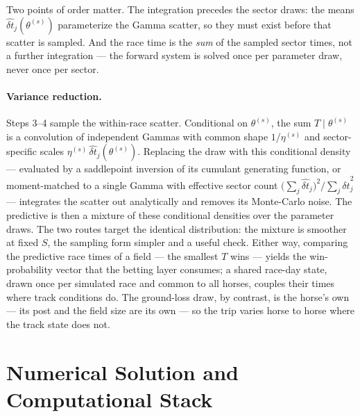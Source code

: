 \documentclass[11pt]{article}
\begin{document}
Two points of order matter. The integration precedes the sector draws: the means $\hat{\delta t}_j(\theta^{(s)})$ parameterize the Gamma scatter, so they must exist before that scatter is sampled. And the race time is the \emph{sum} of the sampled sector times, not a further integration --- the forward system is solved once per parameter draw, never once per sector.

\paragraph{Variance reduction.} Steps 3--4 sample the within-race scatter. Conditional on $\theta^{(s)}$, the sum $T \mid \theta^{(s)}$ is a convolution of independent Gammas with common shape $1/\eta^{(s)}$ and sector-specific scales $\eta^{(s)}\, \hat{\delta t}_j(\theta^{(s)})$. Replacing the draw with this conditional density --- evaluated by a saddlepoint inversion of its cumulant generating function, or moment-matched to a single Gamma with effective sector count $\bigl(\sum_j \hat{\delta t}_j\bigr)^2 / \sum_j \hat{\delta t}_j^2$ --- integrates the scatter out analytically and removes its Monte-Carlo noise. The predictive is then a mixture of these conditional densities over the parameter draws. The two routes target the identical distribution: the mixture is smoother at fixed $S$, the sampling form simpler and a useful check. Either way, comparing the predictive race times of a field --- the smallest $T$ wins --- yields the win-probability vector that the betting layer consumes; a shared race-day state, drawn once per simulated race and common to all horses, couples their times where track conditions do. The ground-loss draw, by contrast, is the horse's own --- its post and the field size are its own --- so the trip varies horse to horse where the track state does not.

\section{Numerical Solution and Computational Stack}\label{sec:numerics}
\end{document}
